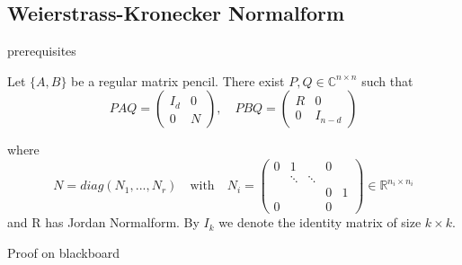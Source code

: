 	\subsection{Weierstrass-Kronecker Normalform}
	
	\begin{frame}
		prerequisites
	\end{frame}
	
	\begin{frame}
		\begin{theorem}%
			\label{Kronecker-Normalform}
			Let $\{ A,B \}$ be a regular matrix pencil. There exist $P,Q \in \mathbb{C}^{n \times n}$ such that
			\begin{displaymath}
				PAQ = 
				\left(
				\begin{matrix}
					I_d & 0 \\
					0 & N 
				\end{matrix}
				\right), \quad
				PBQ = 
				\left(
				\begin{matrix}
					R & 0 \\
					0 & I_{n-d}
				\end{matrix}
				\right)
			\end{displaymath}
			
			where
			\begin{displaymath}
				N = diag(N_1, ..., N_r) \quad \text{with} \quad N_i = 
				\left(
				\begin{matrix}
					0 & 1 & & 0\\
					& \ddots &\ddots & \\
					& & & 0 & 1 \\
					0 & & & 0
				\end{matrix}
				\right)
				\in \mathbb{R}^{n_i \times n_i}
			\end{displaymath}
			and R has Jordan Normalform. By $I_k$ we denote the identity matrix of size $k \times k$.
		\end{theorem}
		Proof on blackboard
	\end{frame}
	
